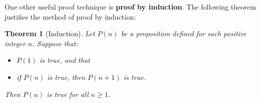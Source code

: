 \documentclass[12pt]{article}
\newtheorem{theorem}{\color{navy}Theorem}[section]
\theoremstyle{definition}
\numberwithin{equation}{subsection}
\begin{document}


\bigskip


One other useful proof technique is \textbf{proof by induction}.  The following theorem justifies the method of proof by induction:

\begin{theorem}[Induction]\label{Induction}  Let $P(n)$ be a proposition defined for each positive integer $n$.  Suppose that:
\begin{itemize}
\item[(A)] $P(1)$ is true, and that
\item[(B)] if $P(n)$ is true, then $P(n + 1)$ is true.
\end{itemize}
Then $P(n)$ is true for all $n \geq 1$.
\end{theorem}
\end{document}
